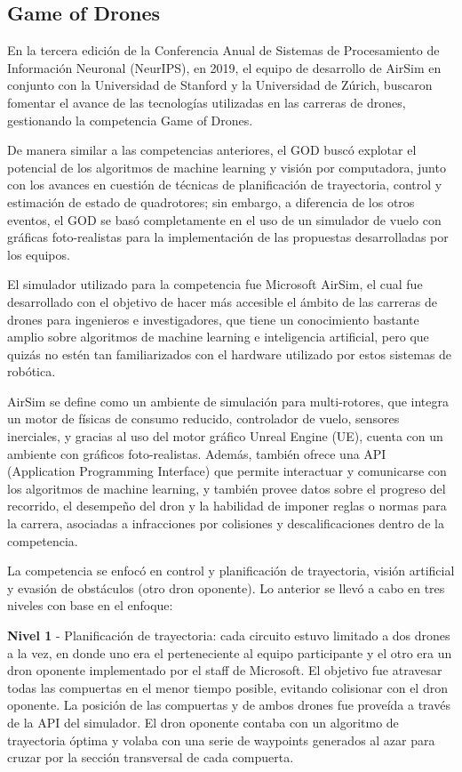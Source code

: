 \subsection{Game of Drones}
En la tercera edición de la Conferencia Anual de Sistemas de Procesamiento de Información Neuronal (NeurIPS), en 2019, el equipo de desarrollo de AirSim\cite{foehn2020alphapilot} en conjunto con la Universidad de Stanford y la Universidad de Zúrich, buscaron fomentar el avance de las tecnologías utilizadas en las carreras de drones, gestionando la competencia Game of Drones.

De manera similar a las competencias anteriores, el GOD buscó explotar el potencial de los algoritmos de machine learning y visión por computadora, junto con los avances en cuestión de técnicas de planificación de trayectoria, control y estimación de estado de quadrotores; sin embargo, a diferencia de los otros eventos, el GOD se basó completamente en el uso de un simulador de vuelo con gráficas foto-realistas para la implementación de las propuestas desarrolladas por los equipos. 

El simulador utilizado para la competencia  fue Microsoft AirSim\cite{airsim2017fsr}, el cual fue desarrollado con el objetivo de hacer más accesible el ámbito de las carreras de drones para ingenieros e investigadores, que tiene un conocimiento bastante amplio sobre algoritmos de machine learning e inteligencia artificial, pero que quizás no estén tan familiarizados con el hardware utilizado por estos sistemas de robótica. 

AirSim se define como un ambiente de simulación para multi-rotores, que integra un motor de físicas de consumo reducido, controlador de vuelo, sensores inerciales, y gracias al uso del motor gráfico Unreal Engine (UE), cuenta con un ambiente con gráficos foto-realistas. Además, también ofrece una API (Application Programming Interface) que permite interactuar y comunicarse con los algoritmos de machine learning, y también provee datos sobre el progreso del recorrido, el desempeño del dron y la habilidad de imponer reglas o normas para la carrera, asociadas a infracciones por colisiones y descalificaciones dentro de la competencia.

La competencia se enfocó en control y planificación de trayectoria, visión artificial y evasión de obstáculos (otro dron oponente). Lo anterior se llevó a cabo en tres niveles con base en el enfoque: 

\textbf{Nivel 1} - Planificación de trayectoria: cada circuito estuvo limitado a dos drones a la vez, en donde uno era el perteneciente al equipo participante y el otro era un dron oponente implementado por el staff de Microsoft. El objetivo fue atravesar todas las compuertas en el menor tiempo posible, evitando colisionar con el dron oponente. La posición de las compuertas y de ambos drones fue proveída a través de la API del simulador. El dron oponente contaba con un algoritmo de trayectoria óptima y volaba con una serie de waypoints generados al azar para cruzar por la sección transversal de cada compuerta.


